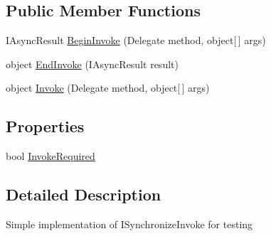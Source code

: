 \subsection*{Public Member Functions}
\begin{DoxyCompactItemize}
\item 
I\+Async\+Result \hyperlink{class_field_service_1_1_tests_1_1_mocks_1_1_mock_synchronize_invoke_acbef03a706f8ee264f2f07fa5095d1dc}{Begin\+Invoke} (Delegate method, object\mbox{[}$\,$\mbox{]} args)
\item 
object \hyperlink{class_field_service_1_1_tests_1_1_mocks_1_1_mock_synchronize_invoke_a4de17a99f634e89155e7d4d679258678}{End\+Invoke} (I\+Async\+Result result)
\item 
object \hyperlink{class_field_service_1_1_tests_1_1_mocks_1_1_mock_synchronize_invoke_a433524a29c9add94135c1f8277d1cec0}{Invoke} (Delegate method, object\mbox{[}$\,$\mbox{]} args)
\end{DoxyCompactItemize}
\subsection*{Properties}
\begin{DoxyCompactItemize}
\item 
bool \hyperlink{class_field_service_1_1_tests_1_1_mocks_1_1_mock_synchronize_invoke_a002e05360e98904721d2e3cc65630cfe}{Invoke\+Required}
\end{DoxyCompactItemize}


\subsection{Detailed Description}
Simple implementation of I\+Synchronize\+Invoke for testing 




